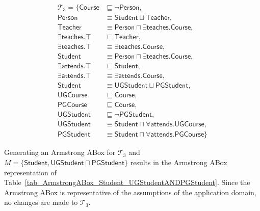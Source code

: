 \documentclass{amsart}
\begin{document}
   \begin{align*}
  \mathcal{T}_3 = \{\mathsf{Course} &\sqsubseteq \neg \mathsf{Person},\\
  \mathsf{Person} &\equiv \mathsf{Student} \sqcup \mathsf{Teacher}, \\ 
  \mathsf{Teacher} &\equiv \mathsf{Person} \sqcap \exists\mathsf{teaches}.\mathsf{Course}, \\
  \exists\mathsf{teaches}.\top &\sqsubseteq \mathsf{Teacher},\\
  \exists\mathsf{teaches}.\top &\equiv \exists\mathsf{teaches}.\mathsf{Course},\\
  \mathsf{Student} &\equiv \mathsf{Person} \sqcap \exists\mathsf{teaches}.\mathsf{Course}, \\
  \exists\mathsf{attends}.\top &\sqsubseteq \mathsf{Student},\\ 
  \exists\mathsf{attends}.\top &\equiv \exists\mathsf{attends}.\mathsf{Course},\\
  \mathsf{Student} &\equiv \mathsf{UGStudent} \sqcup \mathsf{PGStudent}, \\
  \mathsf{UGCourse} &\sqsubseteq \mathsf{Course},\\
  \mathsf{PGCourse} &\sqsubseteq \mathsf{Course},\\
  \mathsf{UGStudent} &\sqsubseteq \neg\mathsf{PGStudent},\\
  \mathsf{UGStudent} &\equiv\mathsf{Student} \sqcap  \forall\mathsf{attends}.\mathsf{UGCourse},\\
  \mathsf{PGStudent} &\equiv \mathsf{Student} \sqcap \forall\mathsf{attends}.\mathsf{PGCourse}\}
  \end{align*}    
   
   
 Generating an Armstrong ABox for $\mathcal{T}_3$ and $M = \{\mathsf{Student}, \mathsf{UGStudent} \sqcap \mathsf{PGStudent}\}$  results in the Armstrong ABox representation of Table~\ref{tab_ArmstrongABox_Student_UGStudentANDPGStudent}. Since the Armstrong ABox is representative of the assumptions of the application domain, no changes are made to $\mathcal{T}_3$.
 
\end{document}

